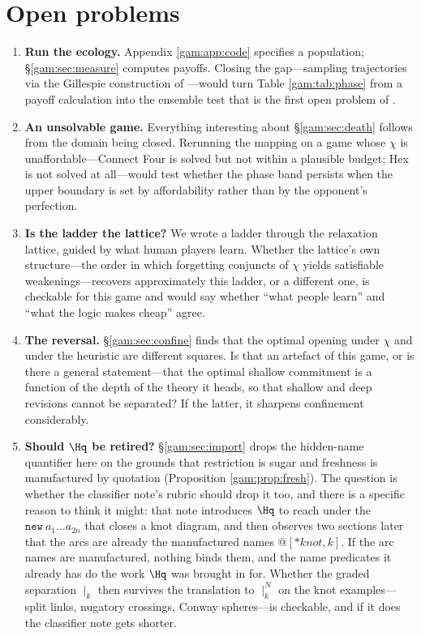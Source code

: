 \section{Open problems}\label{gam:S12}

\begin{enumerate}
\item \textbf{Run the ecology.} Appendix \ref{gam:app:code} specifies a population;
\S\ref{gam:sec:measure} computes payoffs. Closing the gap---sampling trajectories
via the Gillespie construction of \cite{StochSim}---would turn Table
\ref{gam:tab:phase} from a payoff calculation into the ensemble test that is the
first open problem of \chSci.

\item \textbf{An unsolvable game.} Everything interesting about
\S\ref{gam:sec:death} follows from the domain being closed. Rerunning the mapping on
a game whose $\chi$ is unaffordable---Connect Four is solved but not within a
plausible budget; Hex is not solved at all---would test whether the phase band
persists when the upper boundary is set by affordability rather than by the
opponent's perfection.

\item \textbf{Is the ladder the lattice?} We wrote a ladder through the
relaxation lattice, guided by what human players learn. Whether the lattice's own
structure---the order in which forgetting conjuncts of $\chi$ yields satisfiable
weakenings---recovers approximately this ladder, or a different one, is
checkable for this game and would say whether ``what people learn'' and ``what
the logic makes cheap'' agree.

\item \textbf{The reversal.} \S\ref{gam:sec:confine} finds that the optimal opening
under $\chi$ and under the heuristic are different squares. Is that an artefact
of this game, or is there a general statement---that the optimal shallow
commitment is a function of the depth of the theory it heads, so that shallow
and deep revisions cannot be separated? If the latter, it sharpens confinement
considerably.

\item \textbf{Should $\Hq$ be retired?} \S\ref{gam:sec:import} drops the hidden-name
quantifier here on the grounds that restriction is sugar and freshness is
manufactured by quotation (Proposition \ref{gam:prop:fresh}). The question is
whether the classifier note's rubric should drop it too, and there is a specific
reason to think it might: that note introduces $\Hq$ to reach under the
$\texttt{new}\ a_1 \dots a_{2n}$ that closes a knot diagram, and then observes
two sections later that the arcs are already the manufactured names
$@[*\mathit{knot},k]$. If the arc names are manufactured, nothing binds them,
and the name predicates it already has do the work $\Hq$ was brought in for.
Whether the graded separation $\mid_k$ then survives the translation to
$\mid_k^N$ on the knot examples---split links, nugatory crossings, Conway
spheres---is checkable, and if it does the classifier note gets shorter.


\end{enumerate}
